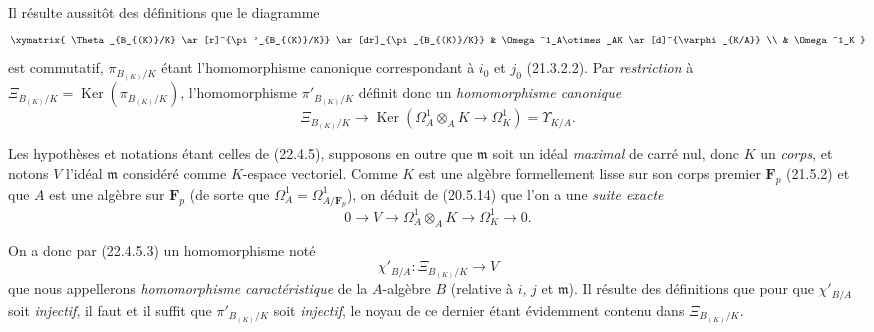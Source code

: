 \begin{env}[22.4.5]

Il résulte aussitôt des définitions que le diagramme
\[
  \xymatrix{
    \Theta_{B_{(K)}/K} \ar[r]^{\pi'_{B_{(K)}/K}} \ar[dr]_{\pi_{B_{(K)}/K}}
      & \Omega^1_A\otimes_AK \ar[d]^{\varphi_{K/A}} \\
    & \Omega^1_K
  }
\]
est commutatif, $\pi_{B_{(K)}/K}$ étant l'homomorphisme canonique
correspondant à $i_0$ et $j_0$ (21.3.2.2). Par \emph{restriction} à
$\Xi_{B_{(K)}/K}=\operatorname{Ker}(\pi_{B_{(K)}/K})$, l'homomorphisme
$\pi'_{B_{(K)}/K}$ définit donc un \emph{homomorphisme canonique}
\begin{equation}
\label{0.22.4.5.3-fr}
  \Xi_{B_{(K)}/K}\longrightarrow
  \operatorname{Ker}(\Omega^1_A\otimes_AK\longrightarrow\Omega^1_K)=\Upsilon_{K/A}.
  \tag{22.4.5.3}
\end{equation}
\end{env}

\begin{env}[22.4.6]
\label{0.22.4.6-fr}
Les hypothèses et notations étant celles de (22.4.5), supposons en outre que
$\mathfrak m$ soit un idéal \emph{maximal} de carré nul, donc $K$ un
\emph{corps}, et notons $V$ l'idéal $\mathfrak m$ considéré comme $K$-espace
vectoriel. Comme $K$ est une algèbre formellement lisse sur son corps premier
$\mathbf F_p$ (21.5.2) et que $A$ est une algèbre sur $\mathbf F_p$ (de sorte
que $\Omega^1_A=\Omega^1_{A/\mathbf F_p}$), on déduit de (20.5.14) que l'on a
une \emph{suite exacte}
\begin{equation}
\label{0.22.4.6.1-fr}
  0\longrightarrow V\longrightarrow\Omega^1_A\otimes_AK
  \longrightarrow\Omega^1_K\longrightarrow0.
  \tag{22.4.6.1}
\end{equation}

On a donc par (22.4.5.3) un homomorphisme noté
\begin{equation}
\label{0.22.4.6.2-fr}
  \chi'_{B/A}:\Xi_{B_{(K)}/K}\longrightarrow V
  \tag{22.4.6.2}
\end{equation}
que nous appellerons \emph{homomorphisme caractéristique} de la $A$-algèbre
$B$ (relative à $i$, $j$ et $\mathfrak m$). Il résulte des définitions que pour
que $\chi'_{B/A}$ soit \emph{injectif}, il faut et il suffit que
$\pi'_{B_{(K)}/K}$ soit \emph{injectif}, le noyau de ce dernier étant évidemment
contenu dans $\Xi_{B_{(K)}/K}$.
\end{env}

